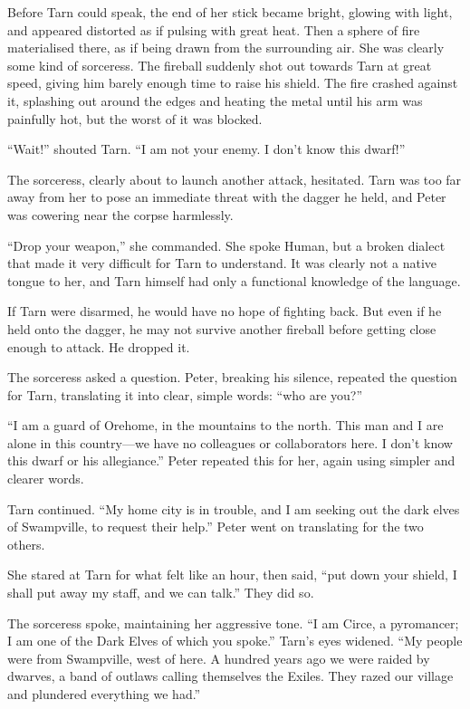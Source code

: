 Before Tarn could speak, the end of her stick became bright, glowing with light, and appeared distorted as if pulsing with great heat.  Then a sphere of fire materialised there, as if being drawn from the surrounding air.  She was clearly some kind of sorceress.  The fireball suddenly shot out towards Tarn at great speed, giving him barely enough time to raise his shield.  The fire crashed against it, splashing out around the edges and heating the metal until his arm was painfully hot, but the worst of it was blocked.

``Wait!'' shouted Tarn.  ``I am not your enemy.  I don't know this dwarf!''

The sorceress, clearly about to launch another attack, hesitated.  Tarn was too far away from her to pose an immediate threat with the dagger he held, and Peter was cowering near the corpse harmlessly.

``Drop your weapon,'' she commanded.  She spoke Human, but a broken dialect that made it very difficult for Tarn to understand. It was clearly not a native tongue to her, and Tarn himself had only a functional knowledge of the language.

If Tarn were disarmed, he would have no hope of fighting back.  But even if he held onto the dagger, he may not survive another fireball before getting close enough to attack.  He dropped it.

The sorceress asked a question.  Peter, breaking his silence, repeated the question for Tarn, translating it into clear, simple words: ``who are you?''

``I am a guard of Orehome, in the mountains to the north.  This man and I are alone in this country---we have no colleagues or collaborators here.  I don't know this dwarf or his allegiance.''  Peter repeated this for her, again using simpler and clearer words.

Tarn continued.  ``My home city is in trouble, and I am seeking out the dark elves of Swampville, to request their help.''  Peter went on translating for the two others.

She stared at Tarn for what felt like an hour, then said, ``put down your shield, I shall put away my staff, and we can talk.''  They did so.

The sorceress spoke, maintaining her aggressive tone.  ``I am Circe, a pyromancer; I am one of the Dark Elves of which you spoke.''  Tarn's eyes widened.  ``My people were from Swampville, west of here.  A hundred years ago we were raided by dwarves, a band of outlaws calling themselves the Exiles.  They razed our village and plundered everything we had.''


